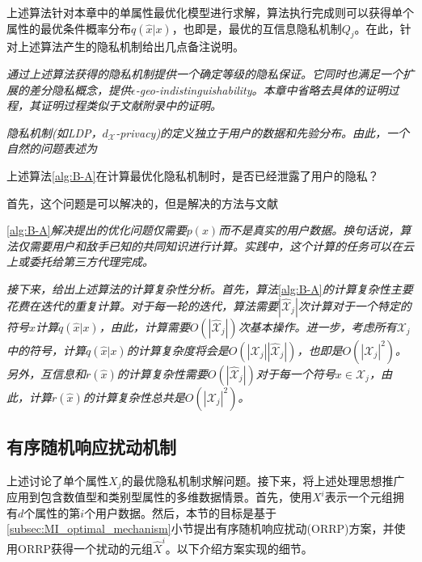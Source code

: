 上述算法针对本章中的单属性最优化模型进行求解，算法执行完成则可以获得单个属性的最优条件概率分布$q(\hat{x}|x)$，也即是，最优的互信息隐私机制$Q_j$。在此，针对上述算法产生的隐私机制给出几点备注说明。

\begin{remark}{\em
	通过上述算法获得的隐私机制提供一个确定等级的隐私保证\textup{\cite{oya2017back,wang2016on,mir2012information}}。它同时也满足一个扩展的差分隐私概念，提供$\epsilon$-geo-indistinguishability。本章中省略去具体的证明过程，其证明过程类似于文献\textup{}附录中的证明。}
\end{remark}

\begin{remark}{\em
隐私机制(如LDP，$d_{\mathcal{X}}$-privacy)的定义独立于用户的数据和先验分布。由此，一个自然的问题表述为
\begin{question}
上述算法\textup{\ref{alg:B-A}}在计算最优化隐私机制时，是否已经泄露了用户的隐私？
\end{question}
首先，这个问题是可以解决的，但是解决的方法与文献}\ref{alg:B-A}{\em 解决提出的优化问题仅需要$p(x)$而不是真实的用户数据。换句话说，算法仅需要用户和敌手已知的共同知识进行计算。实践中，这个计算的任务可以在云上或委托给第三方代理完成。}

\end{remark}

\begin{remark}{\em 接下来，给出上述算法的计算复杂性分析。首先，算法}\ref{alg:B-A}{\em 的计算复杂性主要花费在迭代的重复计算。对于每一轮的迭代，算法需要$|\hat{\mathcal{X}}_j|$次计算对于一个特定的符号$x$计算$q(\hat{x}|x)$，由此，计算需要$O(|\hat{\mathcal{X}}_j|)$次基本操作。进一步，考虑所有$\mathcal{X}_j$中的符号，计算$q(\hat{x}|x)$的计算复杂度将会是$O(|\mathcal{X}_j||\hat{\mathcal{X}}_j|)$，也即是$O(|\mathcal{X}_j|^2)$。另外，互信息和$r(\hat{x})$的计算复杂性需要$O(|\hat{\mathcal{X}}_j|)$对于每一个符号$x \in \mathcal{X}_j$，由此，计算$r(\hat{x})$的计算复杂性总共是$O(|\mathcal{X}_j|^2)$。}
\end{remark}


\subsection{有序随机响应扰动机制}\label{subsec:ORRP}

上述讨论了单个属性$X_j$的最优隐私机制求解问题。接下来，将上述处理思想推广应用到包含数值型和类别型属性的多维数据情景。首先，使用$X^i$表示一个元组拥有$d$个属性的第$i$个用户数据。然后，本节的目标是基于\ref{subsec:MI_optimal_mechanism}小节提出有序随机响应扰动(ORRP)方案，并使用ORRP获得一个扰动的元组$\hat{X}^i$。以下介绍方案实现的细节。

